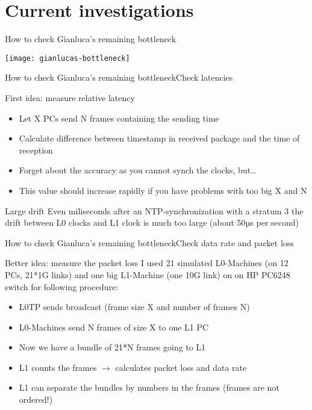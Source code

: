 \section{Current investigations}

\begin{frame}{How to check Gianluca's remaining bottleneck}{}
	\begin{center} 
		\texttt{[image: gianlucas-bottleneck]}
	\end{center} 
\end{frame}

\begin{frame}{How to check Gianluca's remaining bottleneck}{Check latencies}
	\begin{block}{First idea: measure relative latency}
		\begin{itemize}
		  \item Let X PCs send N frames containing the sending time
		  \item Calculate difference between timestamp in received package and the
		  time of reception 
		  \item Forget about the accuracy as you cannot synch the clocks, but\ldots
		  \item This value should increase rapidly if you have problems with too big X
		  and N
		\end{itemize}
	\end{block}
	\begin{alertblock}{Large drift}
		Even miliseconds after an NTP-synchronization with a stratum 3 the drift
		between L0 clocks and L1 clock is much too large (about 50µs per second)
	\end{alertblock}
\end{frame}

\begin{frame}{How to check Gianluca's remaining bottleneck}{Check data rate and
packet loss}
	\begin{block}{Better idea: measure the packet loss}
		I used 21 simulated L0-Machines (on 12 PCs, 21*1G links) and one big
		L1-Machine (one 10G link) on on HP PC6248 switch for following procedure:
	\end{block}
	
	\begin{itemize}
	  \item L0TP sends broadcast (frame size X and number of frames N)
	  \item L0-Machines send N frames of size X to one L1 PC
	  \item Now we have a bundle of 21*N frames going to L1
	  \item L1 counts the frames $\rightarrow$ calculates packet loss and data rate
	  \item L1 can separate the bundles by numbers in the frames (frames are not
	  ordered!)
	\end{itemize}
\end{frame}

